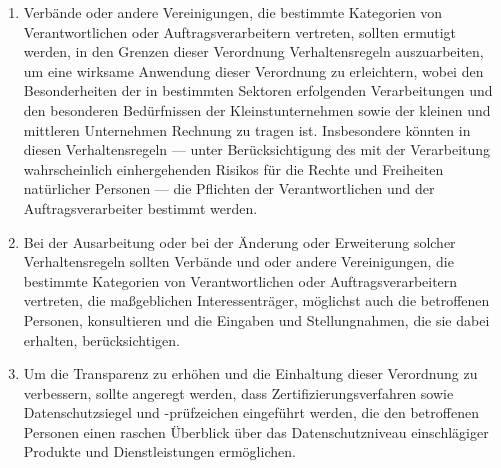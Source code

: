 \begin{enumerate}

   \item Verbände oder andere Vereinigungen, die bestimmte Kategorien von Verantwortlichen oder Auftragsverarbeitern
    vertreten, sollten ermutigt werden, in den Grenzen dieser Verordnung Verhaltensregeln auszuarbeiten, um eine
    wirksame Anwendung dieser Verordnung zu erleichtern, wobei den Besonderheiten der in bestimmten Sektoren
    erfolgenden Verarbeitungen und den besonderen Bedürfnissen der Kleinstunternehmen sowie der kleinen und mittleren
    Unternehmen Rechnung zu tragen ist. Insbesondere könnten in diesen Verhaltensregeln — unter Berücksichtigung des
    mit der Verarbeitung wahrscheinlich einhergehenden Risikos für die Rechte und Freiheiten natürlicher Personen — die
    Pflichten der Verantwortlichen und der Auftragsverarbeiter bestimmt werden.%
   \label{itm:eg-98}
   

   \item Bei der Ausarbeitung oder bei der Änderung oder Erweiterung solcher Verhaltensregeln sollten Verbände und oder
    andere Vereinigungen, die bestimmte Kategorien von Verantwortlichen oder Auftragsverarbeitern vertreten, die
    maßgeblichen Interessenträger, möglichst auch die betroffenen Personen, konsultieren und die Eingaben und
    Stellungnahmen, die sie dabei erhalten, berücksichtigen.%
   \label{itm:eg-99}
   

   \item Um die Transparenz zu erhöhen und die Einhaltung dieser Verordnung zu verbessern, sollte angeregt werden, dass
    Zertifizierungsverfahren sowie Datenschutzsiegel und -prüfzeichen eingeführt werden, die den betroffenen Personen
    einen raschen Überblick über das Datenschutzniveau einschlägiger Produkte und Dienstleistungen ermöglichen.%
   \label{itm:eg-100}
   


\end{enumerate}
